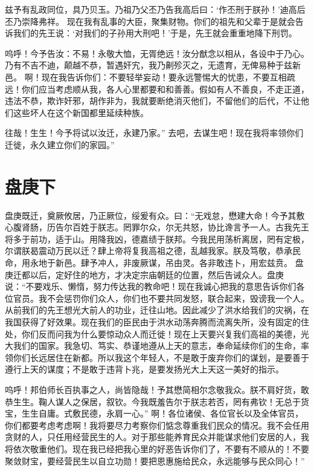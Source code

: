 \documentclass[a4paper,12pt,UTF8,twoside]{ctexbook}
\begin{document}
兹予有乱政同位，具乃贝玉。乃祖乃父丕乃告我高后曰：‘作丕刑于朕孙！’迪高后丕乃崇降弗祥。
现在我有乱事的大臣，聚集财物。你们的祖先和父辈于是就会告诉我们的先王说：‘对我们的子孙用大刑吧！’于是，先王就会重重地降下刑罚。

呜呼！今予告汝：不易！永敬大恤，无胥绝远！汝分猷念以相从，各设中于乃心。乃有不吉不迪，颠越不恭，暂遇奸宄，我乃劓殄灭之，无遗育，无俾易种于兹新邑。
啊！现在我告诉你们：不要轻举妄动！要永远警惕大的忧患，不要互相疏远！你们应当考虑顺从我，各人心里都要和和善善。假如有人不善良，不走正道，违法不恭，欺诈奸邪，胡作非为，我就要断绝消灭他们，不留他们的后代，不让他们这些坏人在这个新国都里延续种族。

往哉！生生！今予将试以汝迁，永建乃家。”
去吧，去谋生吧！现在我将率领你们迁徙，永久建立你们的家园。”

\chapter{盘庚下}

盘庚既迁，奠厥攸居，乃正厥位，绥爰有众。曰：“无戏怠，懋建大命！今予其敷心腹肾肠，历告尔百姓于朕志。罔罪尔众，尔无共怒，协比谗言予一人。古我先王将多于前功，适于山。用降我凶，德嘉绩于朕邦。今我民用荡析离居，罔有定极，尔谓朕曷震动万民以迁？肆上帝将复我高祖之德，乱越我家。朕及笃敬，恭承民命，用永地于新邑。肆予冲人，非废厥谋，吊由灵。各非敢违卜，用宏兹贲。
盘庚迁都以后，定好住的地方，才决定宗庙朝廷的位置，然后告诫众人。盘庚说：“不要戏乐、懒惰，努力传达我的教命吧！现在我诚心把我的意思告诉你们各位官员。我不会惩罚你们众人，你们也不要共同发怒，联合起来，毁谤我一个人。从前我们的先王想光大前人的功业，迁往山地。因此减少了洪水给我们的灾祸，在我国获得了好效果。现在我们的臣民由于洪水动荡奔腾而流离失所，没有固定的住处，你们反而问我为什么要惊动众人而迁徙！现在上天要兴复我们高祖的美德，光大我们的国家。我急切、笃实、恭谨地遵从上天的意志，奉命延续你们的生命，率领你们长远居住在新都。所以我这个年轻人，不是敢于废弃你们的谋划，是要善于遵行上天的谋度；不是敢于违背卜兆，是要发扬光大上天这一美好的指示。

呜呼！邦伯师长百执事之人，尚皆隐哉！予其懋简相尔念敬我众。朕不肩好货，敢恭生生。鞠人谋人之保居，叙钦。今我既羞告尔于朕志若否，罔有弗钦！无总于货宝，生生自庸。式敷民德，永肩一心。”
啊！各位诸侯、各位官长以及全体官员，你们都要考虑考虑啊！我将要尽力考察你们惦念尊重我们民众的情况。我不会任用贪财的人，只任用经营民生的人。对于那些能养育民众并能谋求他们安居的人，我将依次敬重他们。现在我已经把我心里的好恶告诉你们了，不要有不顺从的！不要聚敛财宝，要经营民生以自立功勋！要把恩惠施给民众，永远能够与民众同心！”
\end{document}

